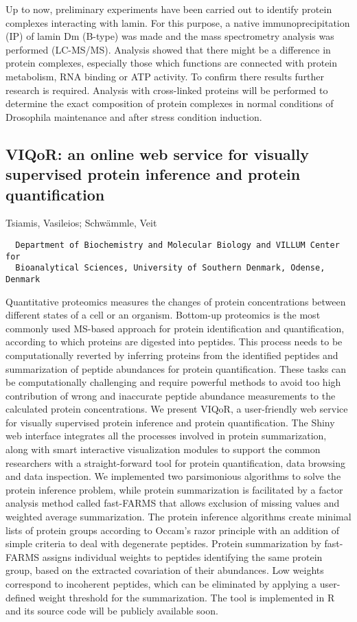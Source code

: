 {Up to now, preliminary experiments have been carried out to identify protein complexes interacting with lamin. For this purpose, a native immunoprecipitation (IP) of lamin Dm (B-type) was made and the mass spectrometry analysis was performed (LC-MS/MS). Analysis showed that there might be a difference in protein complexes, especially those which functions are connected with protein metabolism, RNA binding or ATP activity. To confirm there results further research is required. Analysis with cross-linked proteins will be performed to determine the exact composition of protein complexes in normal conditions of Drosophila maintenance and after stress condition induction.


\subsection*{\color{eubicRed} VIQoR: an online web service for visually supervised protein inference and protein quantification}
{\color{eubicGray}Tsiamis, Vasileios;
Schwämmle, Veit}
{\color{eubicGray}\begin{verbatim}
  Department of Biochemistry and Molecular Biology and VILLUM Center for
  Bioanalytical Sciences, University of Southern Denmark, Odense, Denmark
\end{verbatim}}

Quantitative proteomics measures the changes of protein concentrations between different states of a cell or an organism. Bottom-up proteomics is the most commonly used MS-based approach for protein identification and quantification, according to which proteins are digested into peptides. This process needs to be computationally reverted by inferring proteins from the identified peptides and summarization of peptide abundances for protein quantification. These tasks can be computationally challenging and require powerful methods to avoid too high contribution of wrong and inaccurate peptide abundance measurements to the calculated protein concentrations. We present VIQoR, a user-friendly web service for visually supervised protein inference and protein quantification. The Shiny web interface integrates all the processes involved in protein summarization, along with smart interactive visualization modules to support the common researchers with a straight-forward tool for protein quantification, data browsing and data inspection. We implemented two parsimonious algorithms to solve the protein inference problem, while protein summarization is facilitated by a factor analysis method called fast-FARMS that allows exclusion of missing values and weighted average summarization. The protein inference algorithms create minimal lists of protein groups according to Occam’s razor principle with an addition of simple criteria to deal with degenerate peptides. Protein summarization by fast-FARMS assigns individual weights to peptides identifying the same protein group, based on the extracted covariation of their abundances. Low weights correspond to incoherent peptides, which can be eliminated by applying a user-defined weight threshold for the summarization. The tool is implemented in R and its source code will be publicly available soon.


}
